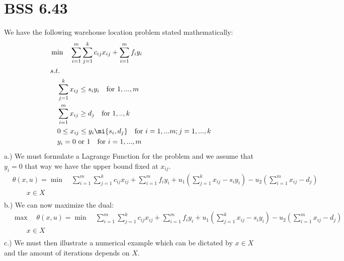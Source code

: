 \documentclass[12pt]{article}
\begin{document}
\section{BSS 6.43}
    We have the following warehouse location problem stated mathematically:\\
        \begin{align*}
            &\min \quad \sum_{i=1}^{m} \sum_{j=1}^{k}c_{ij}x_{ij} + \sum_{i=1}^{m} f_iy_i\\
            &s.t.\\
            &\quad \sum_{j=1}^{k} x_{ij} \leq s_iy_i \quad \text{for } 1,...,m\\
            &\quad \sum_{i=1}^{m}x_{ij} \geq d_j \quad \text{for } 1,..,k\\
            &\quad 0 \leq x_{ij} \leq y_i \mi\{s_i,d_j\} \quad \text{for } i=1,...m ; j=1,...,k\\
            &\quad y_i = 0 \text{ or } 1 \quad \text{for } i=1,...,m\\
        \end{align*}
    a.) We must formulate a Lagrange Function for the problem and we assume that $y_i = 0$ that way we have the upper bound fixed at $x_{ij}$.\\
        \begin{align*}
            &\theta (x, u) = \min \quad \sum_{i=1}^{m} \sum_{j=1}^{k}c_{ij}x_{ij} + \sum_{i=1}^{m} f_iy_i + u_1 (\sum_{j=1}^{k} x_{ij} - s_iy_i) - u_2(\sum_{i=1}^{m}x_{ij} - d_j)\\
            &\quad \quad x \in X\\
        \end{align*}
    b.) We can now maximize the dual:
        \begin{align*}
            &\max \quad \theta(x,u)= \min \quad \sum_{i=1}^{m} \sum_{j=1}^{k}c_{ij}x_{ij} + \sum_{i=1}^{m} f_iy_i + u_1 (\sum_{j=1}^{k} x_{ij} - s_iy_i) - u_2(\sum_{i=1}^{m}x_{ij} - d_j)\\
            &\quad \quad x \in X\\
        \end{align*}
    c.) We must then illustrate a numerical example which can be dictated by $x \in X$ and the amount of iterations depends on $X$.
\end{document}
